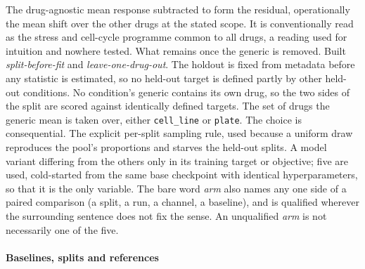 \begin{description}[leftmargin=1em, itemsep=0.5ex,
                    font=\normalfont\bfseries]
 The drug-agnostic mean response subtracted to form
  the residual, operationally the mean shift over the other drugs at the stated
  scope. It is conventionally read as the stress and cell-cycle programme common
  to all drugs, a reading used for intuition and nowhere tested.
 What remains once the generic is removed.
  Built \emph{split-before-fit} and \emph{leave-one-drug-out}.
 The holdout is fixed from metadata before
  any statistic is estimated, so no held-out target is defined partly by other
  held-out conditions.
 No condition's generic contains its own drug,
  so the two sides of the split are scored against identically defined targets.
 The set of drugs the generic mean is taken over, either
  \texttt{cell\_line} or \texttt{plate}. The choice is consequential.
 The explicit per-split sampling rule, used because a
  uniform draw reproduces the pool's proportions and starves the held-out
  splits.
 A model variant differing from the others only in
  its training target or objective; five are used, cold-started from the same
  base checkpoint with identical hyperparameters, so that it is the only
  variable. The bare word \emph{arm} also names any one
  side of a paired comparison (a split, a run, a channel, a baseline), and is
  qualified wherever the surrounding sentence does not fix the sense. An
  unqualified \emph{arm} is not necessarily one of the five.
\end{description}

\paragraph{Baselines, splits and references}

